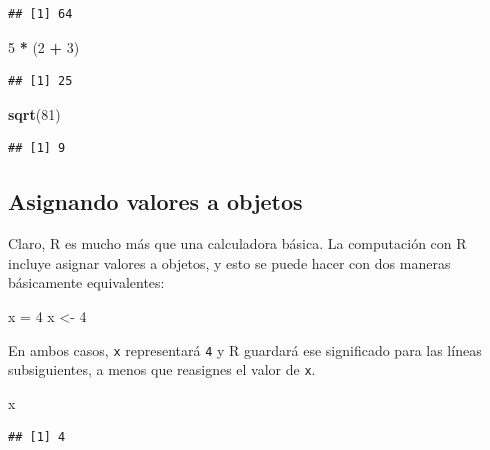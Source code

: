 \documentclass[
]{article}
\newenvironment{Shaded}{\begin{snugshade}}{\end{snugshade}}
\newcommand{\DecValTok}[1]{\textcolor[rgb]{0.00,0.00,0.81}{#1}}
\newcommand{\FunctionTok}[1]{\textcolor[rgb]{0.13,0.29,0.53}{\textbf{#1}}}
\newcommand{\NormalTok}[1]{#1}
\newcommand{\OtherTok}[1]{\textcolor[rgb]{0.56,0.35,0.01}{#1}}
\newcommand{\SpecialCharTok}[1]{\textcolor[rgb]{0.81,0.36,0.00}{\textbf{#1}}}
\begin{document}
\begin{verbatim}
## [1] 64
\end{verbatim}

\begin{Shaded}
\begin{Highlighting}[]
\DecValTok{5} \SpecialCharTok{*}\NormalTok{ (}\DecValTok{2} \SpecialCharTok{+} \DecValTok{3}\NormalTok{)}
\end{Highlighting}
\end{Shaded}

\begin{verbatim}
## [1] 25
\end{verbatim}

\begin{Shaded}
\begin{Highlighting}[]
\FunctionTok{sqrt}\NormalTok{(}\DecValTok{81}\NormalTok{)}
\end{Highlighting}
\end{Shaded}

\begin{verbatim}
## [1] 9
\end{verbatim}

\subsection{Asignando valores a
objetos}\label{asignando-valores-a-objetos}

Claro, R es mucho más que una calculadora básica. La computación con R
incluye asignar valores a objetos, y esto se puede hacer con dos maneras
básicamente equivalentes:

\begin{Shaded}
\begin{Highlighting}[]
\NormalTok{x }\OtherTok{=} \DecValTok{4}
\NormalTok{x }\OtherTok{\textless{}{-}} \DecValTok{4}
\end{Highlighting}
\end{Shaded}

En ambos casos, \texttt{x} representará \texttt{4} y R guardará ese
significado para las líneas subsiguientes, a menos que reasignes el
valor de \texttt{x}.

\begin{Shaded}
\begin{Highlighting}[]
\NormalTok{x}
\end{Highlighting}
\end{Shaded}

\begin{verbatim}
## [1] 4
\end{verbatim}
\end{document}
